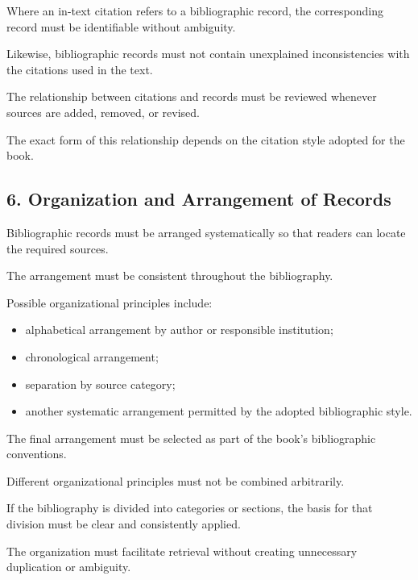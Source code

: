 Where an in-text citation
refers to a bibliographic
record, the corresponding
record must be identifiable
without ambiguity.

Likewise, bibliographic
records must not contain
unexplained inconsistencies
with the citations used
in the text.

The relationship between
citations and records must
be reviewed whenever
sources are added, removed,
or revised.

The exact form of this
relationship depends on
the citation style adopted
for the book.


\subsection*{6. Organization and Arrangement
of Records}

Bibliographic records must
be arranged systematically
so that readers can locate
the required sources.

The arrangement must be
consistent throughout
the bibliography.

Possible organizational
principles include:

\begin{itemize}
    \item alphabetical arrangement
    by author or responsible
    institution;
    \item chronological arrangement;
    \item separation by source
    category;
    \item another systematic
    arrangement permitted
    by the adopted bibliographic
    style.
\end{itemize}

The final arrangement
must be selected as part
of the book's bibliographic
conventions.

Different organizational
principles must not be
combined arbitrarily.

If the bibliography is
divided into categories
or sections, the basis
for that division must
be clear and consistently
applied.

The organization must
facilitate retrieval without
creating unnecessary
duplication or ambiguity.


